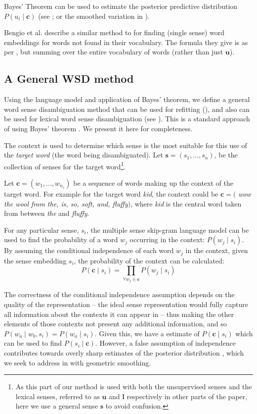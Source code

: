 \documentclass{article}
\def\parencite{\cite}
\renewcommand{\c}{\mathbf{c}}
\newcommand{\s}{\mathbf{s}}
\renewcommand{\l}{\mathbf{l}}
\renewcommand{\u}{\mathbf{u}}
\begin{document}
Bayes' Theorem can be used to estimate the posterior predictive distribution $P(u_i \mid \c)$ (see ; or the smoothed variation in ).

Bengio et al.  describe a similar method to  for finding  (single sense) word embeddings for words not found in their vocabulary.
The formula they give is as per , but summing over the entire vocabulary of words (rather than just $\u$).


\subsection{A General WSD method} \label{generalwsd}
Using the language model and application of Bayes' theorem, we define a general word sense disambiguation method that can be used for refitting (), and also can be used for lexical word sense disambiguation (see ).
This is a standard approach of using Bayes' theorem \parencite{tian2014probabilistic,AdaGrams}.
We present it here for completeness.

The context is used to determine which sense is the most suitable for this use of the \emph{target word} (the word being disambiguated).
Let $\s=(s_{1},...,s_{n})$, be the collection of senses for the target word\footnote{As this part of our method is used with both the unsupervised senses and the lexical senses, referred to as $\u$ and $\l$ respectively in other parts of the paper, here we use a general sense $\s$ to avoid confusion.}.

Let $\c=(w_{1},...,w_{n_c})$ be a sequence of words making up the context of the target word.
For example for the target word \emph{kid}, the context could be $\c=($ \emph{ wow the wool from the, is, so, soft, and, fluffy}$)$, where \emph{kid} is the central word taken from between \emph{the} and \emph{fluffy}.

For any particular sense, $s_i$, the multiple sense skip-gram language model can be used to find the probability of a word $w_j$ occurring in the context: $P(w_j \mid s_i)$.
By assuming the conditional independence of each word $w_j$ in the context, given the sense embedding $s_i$, the probability of the context can be calculated:
\begin{equation} \label{eq:contextprobtrue}
P(\c \mid s_{i})=\prod_{\forall w_{j}\in\c}P(w_{j} \mid s_{i})
\end{equation}

The correctness of the conditional independence assumption depends on the quality of the representation -- the ideal sense representation would fully capture all information about the contexts it can appear in -- thus making the other elements of those contexts not present any additional information, and so  $P(w_a \mid w_b,s_i)=P(w_a \mid s_i)$.
Given this, we have a estimate of $P(\c \mid s_{i})$ which can be used to find $P(s_i \mid \c)$.
However, a false assumption of independence contributes towards overly sharp estimates of the posterior distribution \cite{rosenfeld2000two}, which we seek to address in  with geometric smoothing.
\end{document}
